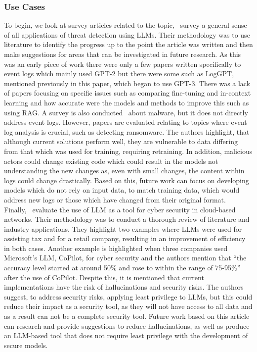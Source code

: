 \subsubsection{Use Cases}
To begin, we look at survey articles related to the topic,~\cite{chen2024survey} survey a general sense of all applications of threat detection using LLMs. Their methodology was to use literature to identify the progress up to the point the article was written and then make suggestions for areas that can be investigated in future research. As this was an early piece of work there were only a few papers written specifically to event logs which mainly used GPT-2 but there were some such as LogGPT, mentioned previously in this paper, which began to use GPT-3. There was a lack of papers focusing on specific issues such as comparing fine-tuning and in-context learning and how accurate were the models and methods to improve this such as using RAG. A survey is also conducted~\cite{khanllms} about malware, but it does not directly address event logs. However, papers are evaluated relating to topics where event log analysis is crucial, such as detecting ransomware. The authors highlight, that although current solutions perform well, they are vulnerable to data differing from that which was used for training, requiring retraining. In addition, malicious actors could change existing code which could result in the models not understanding the new changes as, even with small changes, the content within logs could change drastically. Based on this, future work can focus on developing models which do not rely on input data, to match training data, which would address new logs or those which have changed from their original format. Finally,~\cite{patil2024leveraging} evaluate the use of LLM as a tool for cyber security in cloud-based networks. Their methodology was to conduct a thorough review of literature and industry applications. They highlight two examples where LLMs were used for assisting tax and for a retail company, resulting in an improvement of efficiency in both cases. Another example is highlighted when three companies used Microsoft's LLM, CoPilot, for cyber security and the authors mention that ``the accuracy level started at around 50\% and rose to within the range of 75-95\%'' after the use of CoPilot. Despite this, it is mentioned that current implementations have the risk of hallucinations and security risks. The authors suggest, to address security risks, applying least privilege to LLMs, but this could reduce their impact as a security tool, as they will not have access to all data and as a result can not be a complete security tool. Future work based on this article can research and provide suggestions to reduce hallucinations, as well as produce an LLM-based tool that does not require least privilege with the development of secure models.

